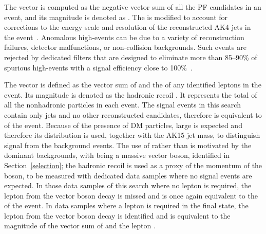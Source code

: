 The vector \ptvecmiss is computed as the negative vector \pt sum of all the PF candidates in an event, and its magnitude is denoted as \ptmiss. The \ptvecmiss is modified to account for corrections to the energy scale and resolution of the reconstructed AK4 jets in the event~\cite{Sirunyan:2019kia}.  Anomalous high-\ptmiss events can be due to a variety of reconstruction failures, detector malfunctions, or non-collision backgrounds. Such events are rejected by dedicated filters that are designed to eliminate more than 85--90\% of spurious high-\ptmiss events with a signal efficiency close to 100\%~\cite{Sirunyan:2019kia}. 

The vector \recoilvec is defined as the vector sum of \ptvecmiss and the \ptvec of any identified leptons in the event. Its magnitude is denoted as the hadronic recoil \recoil. It represents the total \PT of all the nonhadronic particles in each event. The signal events in this search contain only jets and no other reconstructed candidates, therefore \recoil is equivalent to \ptmiss of the event. Because of the presence of DM particles, large \recoil is expected and therefore its distribution is used, together with the AK15 jet mass, to distinguish signal from the background events. The use of \recoil rather than \ptmiss is motivated by the dominant \Vjets backgrounds, with \PV being a massive vector boson, identified in Section~\ref{selection}; the hadronic recoil is used as a proxy of the momentum of the \PV boson, to be measured with dedicated data samples where no signal events are expected. In those data samples of this search where no lepton is required, the lepton from the vector boson decay is missed and \recoil is once again equivalent to the \ptmiss of the event. In data samples where a lepton is required in the final state, the lepton from the vector boson decay is identified and \recoil is equivalent to the magnitude of the vector sum of \ptvecmiss and the lepton \ptvec.

